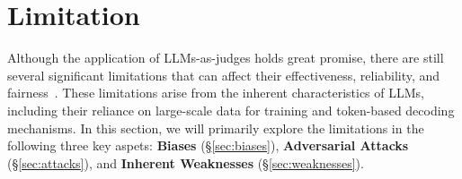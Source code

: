 \section{Limitation}
\label{sec:Limitation}
Although the application of LLMs-as-judges holds great promise, there are still several significant limitations that can affect their effectiveness, reliability, and fairness~\cite{thakur2024judging,stureborg2024large}.
These limitations arise from the inherent characteristics of LLMs, including their reliance on large-scale data for training and token-based decoding mechanisms.
In this section, we will primarily explore the limitations in the following three key aspets: \textbf{Biases} (\S\ref{sec:biases}), \textbf{Adversarial Attacks} (\S\ref{sec:attacks}), and \textbf{Inherent Weaknesses} (\S\ref{sec:weaknesses}).


